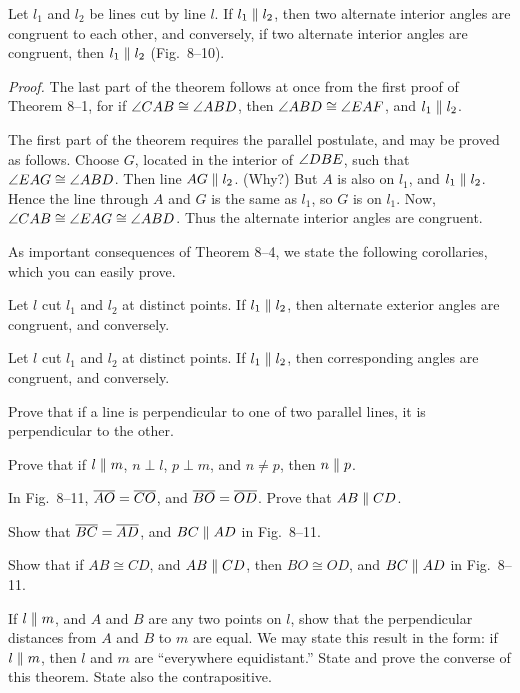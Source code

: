 \documentclass[11pt]{book}
\begin{document}
\FIGVIIININETEN

\begin{theorem}
Let $l_1$ and $l_2$ be lines cut by line $l$. If $l_1 \mathrel{\|} l_2$, then two
alternate interior angles are congruent to each other, and conversely, if two
alternate interior angles are congruent, then $l_1 \mathrel{\|} l_2$
\textup{(Fig.~8--10)}.
\end{theorem}

\emph{Proof.} The last part of the theorem follows at once from the first
proof of Theorem 8--1, for if $\angle CAB \cong \angle ABD$, then
$\angle ABD \cong \angle EAF$, and $l_1 \mathrel{\|} l_2$.

The first part of the theorem requires the parallel postulate, and may be
proved as follows. Choose $G$, located in the interior of $\angle DBE$, such
that $\angle EAG \cong \angle ABD$. Then line $AG \mathrel{\|} l_2$. (Why?) But $A$ is
also on $l_1$, and $l_1 \mathrel{\|} l_2$. Hence the line through $A$ and $G$ is the
same as $l_1$, so $G$ is on $l_1$. Now,
$\angle CAB \cong \angle EAG \cong \angle ABD$. Thus the alternate interior
angles are congruent.

As important consequences of Theorem 8--4, we state the following corollaries,
which you can easily prove.

\begin{corollary}
Let $l$ cut $l_1$ and $l_2$ at distinct points. If $l_1 \mathrel{\|} l_2$, then
alternate exterior angles are congruent, and conversely.
\end{corollary}

\begin{corollary}
Let $l$ cut $l_1$ and $l_2$ at distinct points. If $l_1 \mathrel{\|} l_2$, then
corresponding angles are congruent, and conversely.
\end{corollary}

\begin{exercisecols}
\begin{exlist}
\item Prove that if a line is perpendicular to one of two parallel lines, it
  is perpendicular to the other.
\item Prove that if $l \mathrel{\|} m$, $n \perp l$, $p \perp m$, and $n \neq p$, then
  $n \mathrel{\|} p$.
\item In Fig.~8--11, $\overline{AO} = \overline{CO}$, and $\overline{BO} = \overline{OD}$. Prove that
  $AB \mathrel{\|} CD$.
\exfig{\FIGVIIIELEVEN}
\item Show that $\overline{BC} = \overline{AD}$, and $BC \mathrel{\|} AD$ in Fig.~8--11.
\item Show that if $AB \cong CD$, and $AB \mathrel{\|} CD$, then $BO \cong OD$, and
  $BC \mathrel{\|} AD$ in Fig.~8--11.
\item If $l \mathrel{\|} m$, and $A$ and $B$ are any two points on $l$, show that the
  perpendicular distances from $A$ and $B$ to $m$ are equal. We may state this
  result in the form: if $l \mathrel{\|} m$, then $l$ and $m$ are ``everywhere
  equidistant.'' State and prove the converse of this theorem. State also the
  contrapositive.
\end{exlist}
\end{exercisecols}
\end{document}
